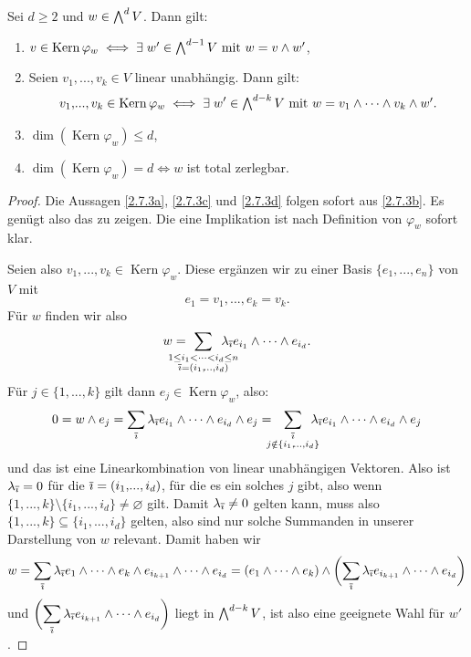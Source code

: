 \documentclass[a4paper,12pt]{scrbook}
\theoremstyle{keinenummern} %
\theoremstyle{mitnummern}
\theoremstyle{unserbeweis}
\newtheorem{proof}{Beweis}
\newcommand{\Kern}{\operatorname{Kern}}
\newcommand{\leer}{\ensuremath{\varnothing}}
\let\olddotsc\dotsc %
\renewcommand{\dotsc}{\ensuremath{\!...}}
\newcommand{\iq}{\Bar{\imath}}
\let\grassmann\bigwedge
\def\bigwedge{\begingroup\textstyle\grassmann\endgroup}
\def\Bar#1{\ensuremath\overline{#1}}
\begin{document}
\begin{lem}\label{2.7.3}
Sei $d\geq 2$ und $w\in\bigwedge^{d}V$. Dann gilt:
\begin{enumerate}
\item{} $v\in\Kern\varphi_{w}\iff\exists\; w'\in\bigwedge^{d-1}V\text{ mit }w=v\wedge w'$,
\item{} Seien $v_{1},\dotsc,v_{k}\in V$ linear unabhängig. Dann gilt:
\[v_{1},\dotsc,v_{k}\in\Kern\varphi_{w}\iff\exists\; w'\in\bigwedge^{d-k}V\text{ mit }w=v_{1}\wedge\dotsm\wedge v_{k}\wedge w'.\]
\item{} $\dim(\Kern\varphi_{w})\leq d$,
\item{} $\dim(\Kern\varphi_{w})=d\iff w$ ist total zerlegbar.
\end{enumerate}\end{lem}

\begin{proof}
Die Aussagen \ref{2.7.3a}, \ref{2.7.3c} und \ref{2.7.3d} folgen sofort aus \ref{2.7.3b}. Es genügt also das zu zeigen. Die eine Implikation ist nach Definition von $\varphi_{w}$ sofort klar. 

Seien also $v_{1},\dotsc,v_{k}\in\Kern\varphi_{w}$. Diese ergänzen wir zu einer Basis $\{e_{1},\dotsc,e_{n}\}$ von $V$ mit 
\[e_{1}=v_{1},\dotsc,e_{k}=v_{k}.\]
Für $w$ finden wir also
\[w=\!\!\!\!\!\!\!\!\!\!\sum_{\substack{1\leq i_{1}<\dotsm<i_{d}\leq n\\\iq=(i_{1},\olddotsc,i_{d})}}\!\!\!\!\!\!\!\!\! \lambda_{\iq}e_{i_{1}}\wedge\dotsm\wedge e_{i_{d}}.\]
Für $j\in\{1,\dotsc,k\}$ gilt dann $e_{j}\in\Kern\varphi_{w}$, also:
\[0=w\wedge e_{j}=\sum_{\iq}\lambda_{\iq}e_{i_{1}}\wedge\dotsm\wedge e_{i_{d}}\wedge e_{j}=\!\!\!\!\sum_{\substack{\iq\\ j\notin\{i_{1},\olddotsc,i_{d}\}}}\!\!\!\!\!\lambda_{\iq}e_{i_{1}}\wedge\dotsm\wedge e_{i_{d}}\wedge e_{j}\]
und das ist eine Linearkombination von linear unabhängigen Vektoren. Also ist $\lambda_{\iq}=0$ für die
$\iq=(i_{1},\dotsc,i_{d})$, für die es ein solches $j$ gibt, also wenn $\{1,\dotsc,k\}\setminus\{i_{1},\dotsc,i_{d}\}\neq\leer$ gilt. Damit $\lambda_{\iq}\neq 0$ gelten kann, muss also $\{1,\dotsc,k\}\subseteq\{i_{1},\dotsc,i_{d}\}$ gelten, also sind nur solche Summanden in unserer Darstellung von $w$ relevant. Damit haben wir
\[w=\sum_{\iq}\lambda_{\iq}e_{1}\wedge\dotsm\wedge e_{k}\wedge e_{i_{k+1}}\wedge\dotsm\wedge e_{i_{d}}=(e_{1}\wedge\dotsm\wedge e_{k})\wedge\biggl(\sum_{\iq}\lambda_{\iq}e_{i_{k+1}}\wedge\dotsm\wedge e_{i_{d}}\biggr)\]
und $\displaystyle\biggl(\sum_{\iq}\lambda_{\iq}e_{i_{k+1}}\wedge\dotsm\wedge e_{i_{d}}\biggr)$ liegt in $\bigwedge^{d-k}V$, ist also eine geeignete Wahl für $w'$.
\end{proof}
\end{document}
